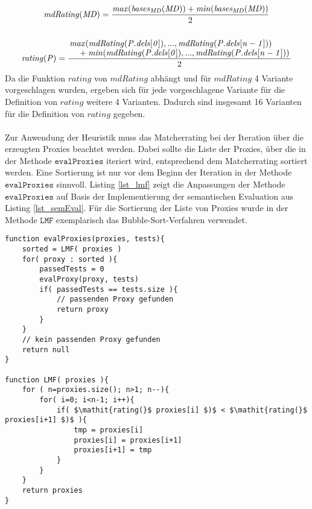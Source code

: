 \begin{gather*}
\mathit{mdRating(MD)} = \frac{\mathit{max(bases_{MD}(MD))}+\mathit{min(bases_{MD}(MD))}}{2}
\\\\
\mathit{rating(P)} = \frac{\splitfrac{ \mathit{max(mdRating(P.dels[0]),...,mdRating(P.dels[n-1]))}}{+\mathit{min(mdRating(P.dels[0]),...,mdRating(P.dels[n-1]))}}}{2}
\end{gather*}
\noindent
Da die Funktion $\mathit{rating}$ von $\mathit{mdRating}$ abhängt und für $\mathit{mdRating}$ 4 Variante vorgeschlagen wurden, ergeben sich für jede vorgeschlagene Variante für die Definition von $\mathit{rating}$ weitere 4 Varianten. Dadurch sind insgesamt 16 Varianten für die Definition von $\mathit{rating}$ gegeben.
\\\\
Zur Anwendung der Heuristik muss das Matcherrating bei der Iteration über die erzeugten Proxies beachtet werden. Dabei sollte die Liste der Proxies, über die in der Methode $\texttt{evalProxies}$ iteriert wird, entsprechend dem Matcherrating sortiert werden. Eine Sortierung ist nur vor dem Beginn der Iteration in der Methode $\texttt{evalProxies}$  sinnvoll. Listing \ref{lst_lmf} zeigt die Anpassungen der Methode $\texttt{evalProxies}$ auf Basis der Implementierung der semantischen Evaluation aus Listing \ref{lst_semEval}. Für die Sortierung der Liste von Proxies wurde in der Methode $\texttt{LMF}$ exemplarisch das Bubble-Sort-Verfahren verwendet.
\begin{lstlisting}[style = pseudo, caption=Semantische Evaluation mit Heuristik LMF, captionpos=b, label=lst_lmf]
function evalProxies(proxies, tests){
	sorted = LMF( proxies )
	for( proxy : sorted ){
		passedTests = 0
		evalProxy(proxy, tests)
		if( passedTests == tests.size ){
			// passenden Proxy gefunden
			return proxy
		}
	}
	// kein passenden Proxy gefunden
	return null
}

function LMF( proxies ){
	for	( n=proxies.size(); n>1; n--){
		for( i=0; i<n-1; i++){
			if( $\mathit{rating(}$ proxies[i] $)$ < $\mathit{rating(}$ proxies[i+1] $)$ ){
				tmp = proxies[i]
				proxies[i] = proxies[i+1]
				proxies[i+1] = tmp
			}
		}
	}	
	return proxies
}
\end{lstlisting}


